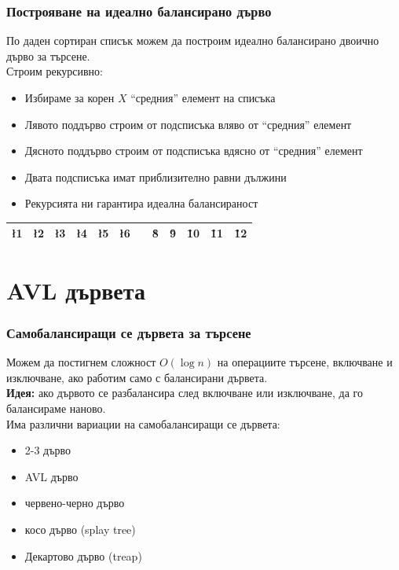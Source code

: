 \documentclass{beamer}
\begin{document}
\begin{frame}
  \frametitle{Построяване на идеално балансирано дърво}
  По даден сортиран списък можем да построим идеално балансирано двоично дърво за търсене.\\[1em]
  Строим рекурсивно:
  \begin{itemize}
  \item Избираме за корен $X$ ``средния'' елемент на списъка
  \item Лявото поддърво строим от подсписъка вляво от ``средния'' елемент
  \item Дясното поддърво строим от подсписъка вдясно от ``средния'' елемент
  \item Двата подсписъка имат приблизително равни дължини
  \item Рекурсията ни гарантира идеална балансираност
  \end{itemize}
  \begin{center}
    \begin{tabular}{*{12}{|c}|}
      \hline
      \l1&\l2&\l3&\l4&\l5&\l6&&\r8&\r9&\r10&\r11&\r12\\
      \hline
    \end{tabular}
  \end{center}
\end{frame}

\section{AVL дървета}

\begin{frame}
  \frametitle{Самобалансиращи се дървета за търсене}
  Можем да постигнем сложност $O(\log n)$ на операциите търсене, включване и изключване, ако работим само с балансирани дървета.\\[1em]
  \pause
  \textbf{Идея:} ако дървото се разбалансира след включване или изключване, да го балансираме наново.\\[1em]
  \pause
  Има различни вариации на самобалансиращи се дървета:
  \begin{itemize}
  \item 2-3 дърво
  \item<alert@4> AVL дърво
  \item червено-черно дърво
  \item косо дърво (splay tree)
  \item Декартово дърво (treap)
  \end{itemize}
  \pause
\end{frame}
\end{document}
